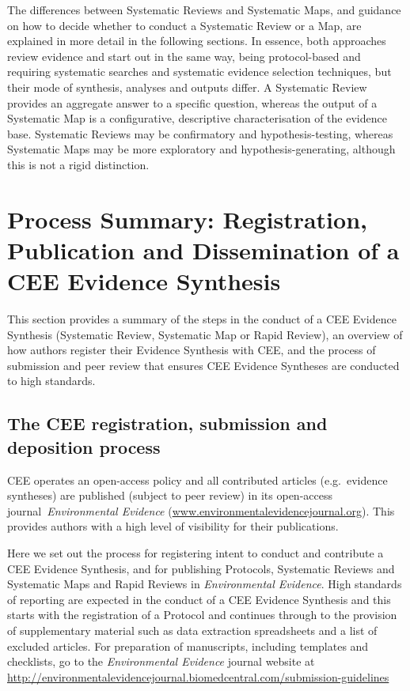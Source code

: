 \documentclass[
  letterpaper,
  DIV=11,
  numbers=noendperiod]{scrreprt}
\begin{document}
The differences between Systematic Reviews and Systematic Maps, and
guidance on how to decide whether to conduct a Systematic Review or a
Map, are explained in more detail in the following sections. In essence,
both approaches review evidence and start out in the same way, being
protocol-based and requiring systematic searches and systematic evidence
selection techniques, but their mode of synthesis, analyses and outputs
differ. A Systematic Review provides an aggregate answer to a specific
question, whereas the output of a Systematic Map is a configurative,
descriptive characterisation of the evidence base. Systematic Reviews
may be confirmatory and hypothesis-testing, whereas Systematic Maps may
be more exploratory and hypothesis-generating, although this is not a
rigid distinction.


\chapter{Process Summary: Registration, Publication and Dissemination of
a CEE Evidence
Synthesis}\label{process-summary-registration-publication-and-dissemination-of-a-cee-evidence-synthesis}

This section provides a summary of the steps in the conduct of a CEE
Evidence Synthesis (Systematic Review, Systematic Map or Rapid Review),
an overview of how authors register their Evidence Synthesis with CEE,
and the process of submission and peer review that ensures CEE Evidence
Syntheses are conducted to high standards.

\section{\texorpdfstring{\textbf{The CEE registration, submission and
deposition
process}}{The CEE registration, submission and deposition process}}\label{the-cee-registration-submission-and-deposition-process}

CEE operates an open-access policy and all contributed articles
(e.g.~evidence syntheses) are published (subject to peer review) in its
open-access journal~\emph{Environmental Evidence}
(\href{http://www.environmentalevidencejournal.org/}{www.environmentalevidencejournal.org}).
This provides authors with a high level of visibility for their
publications.

Here we set out the process for registering intent to conduct and
contribute a CEE Evidence Synthesis, and for publishing Protocols,
Systematic Reviews and Systematic Maps and Rapid Reviews in
\emph{Environmental Evidence}. High standards of reporting are expected
in the conduct of a CEE Evidence Synthesis and this starts with the
registration of a Protocol and continues through to the provision of
supplementary material such as data extraction spreadsheets and a list
of excluded articles. For preparation of manuscripts, including
templates and checklists, go to the \emph{Environmental Evidence}
journal website at
\url{http://environmentalevidencejournal.biomedcentral.com/submission-guidelines}
\end{document}
